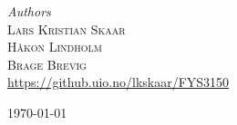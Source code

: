 \begin{titlepage}
		{\large\textit{Authors}}\\
		\textsc{Lars Kristian Skaar}\\
		\textsc{Håkon Lindholm}\\
		\textsc{Brage Brevig} %
		\\
		\url{https://github.uio.no/lkskaar/FYS3150}
		
		\vfill\vfill\vfill %
		
		{\large\today} %
		
		
		\vfill\vfill
		
		
		
	\end{titlepage}

	\newpage
	\setlength\parindent{0pt}
	
